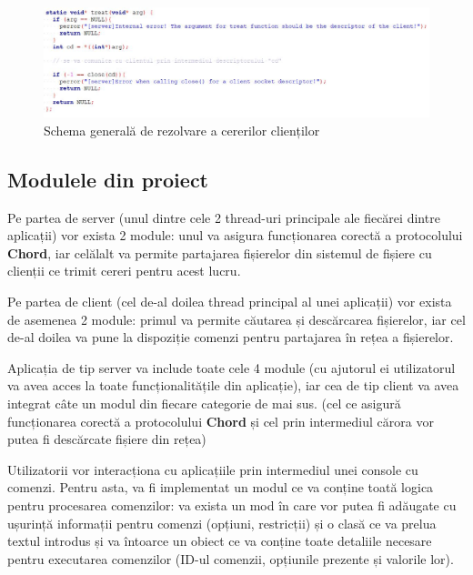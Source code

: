 \documentclass[runningheads]{llncs}
\begin{document}
\begin{figure}[!h]
	\centering
	\includegraphics[width=14cm]{server-client-logic.jpg}
	\caption{Schema generală de rezolvare a cererilor clienților}
\end{figure}

\subsection{Modulele din proiect}

Pe partea de server (unul dintre cele 2 thread-uri principale ale fiecărei dintre aplicații) vor exista 2 module: unul va asigura funcționarea corectă a protocolului \textbf{Chord}, iar celălalt va permite partajarea fișierelor din sistemul de fișiere cu clienții ce trimit cereri pentru acest lucru. 

Pe partea de client (cel de-al doilea thread principal al unei aplicații) vor exista de asemenea 2 module: primul va permite căutarea și descărcarea fișierelor, iar cel de-al doilea va pune la dispoziție comenzi pentru partajarea în rețea a fișierelor. 

Aplicația de tip server va include toate cele 4 module (cu ajutorul ei utilizatorul va avea acces la toate funcționalitățile din aplicație), iar cea de tip client va avea integrat câte un modul din fiecare categorie de mai sus. (cel ce asigură funcționarea corectă a protocolului \textbf{Chord} și cel prin intermediul cărora vor putea fi descărcate fișiere din rețea)

Utilizatorii vor interacționa cu aplicațiile prin intermediul unei console cu comenzi. Pentru asta, va fi implementat un modul ce va conține toată logica pentru procesarea comenzilor: va exista un mod în care vor putea fi adăugate cu ușurință informații pentru comenzi (opțiuni, restricții) și o clasă ce va prelua textul introdus și va întoarce un obiect ce va conține toate detaliile necesare pentru executarea comenzilor (ID-ul comenzii, opțiunile prezente și valorile lor).
\end{document}
